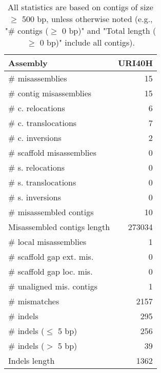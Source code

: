 \documentclass[12pt,a4paper]{article}
\begin{document}
\begin{table}[ht]
\begin{center}
\caption{All statistics are based on contigs of size $\geq$ 500 bp, unless otherwise noted (e.g., "\# contigs ($\geq$ 0 bp)" and "Total length ($\geq$ 0 bp)" include all contigs).}
\begin{tabular}{|l*{1}{|r}|}
\hline
Assembly & URI40H \\ \hline
\# misassemblies & 15 \\ \hline
\hspace{2mm}\# contig misassemblies & 15 \\ \hline
\hspace{5mm}\# c. relocations & 6 \\ \hline
\hspace{5mm}\# c. translocations & 7 \\ \hline
\hspace{5mm}\# c. inversions & 2 \\ \hline
\hspace{2mm}\# scaffold misassemblies & 0 \\ \hline
\hspace{5mm}\# s. relocations & 0 \\ \hline
\hspace{5mm}\# s. translocations & 0 \\ \hline
\hspace{5mm}\# s. inversions & 0 \\ \hline
\# misassembled contigs & 10 \\ \hline
Misassembled contigs length & 273034 \\ \hline
\# local misassemblies & 1 \\ \hline
\# scaffold gap ext. mis. & 0 \\ \hline
\# scaffold gap loc. mis. & 0 \\ \hline
\# unaligned mis. contigs & 1 \\ \hline
\# mismatches & 2157 \\ \hline
\# indels & 295 \\ \hline
\hspace{5mm}\# indels ($\leq$ 5 bp) & 256 \\ \hline
\hspace{5mm}\# indels ($>$ 5 bp) & 39 \\ \hline
Indels length & 1362 \\ \hline
\end{tabular}
\end{center}
\end{table}
\end{document}
